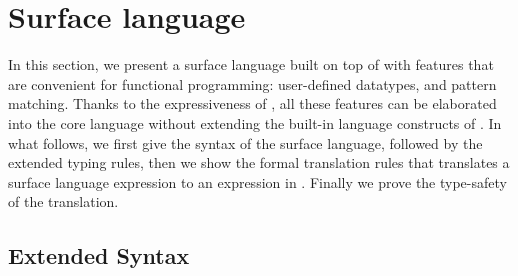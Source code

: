 \newcommand{\FV}{\mathsf{FV}}
\newcommand{\dom}{\mathsf{dom}}

\section{Surface language}
\label{sec:surface}


In this section, we present a surface language built on top of \name with
features that are convenient for functional programming: user-defined
datatypes, and pattern matching. Thanks to the expressiveness of
\name, all these features can be elaborated into the core language
without extending the built-in language constructs of \name. In what
follows, we first give the syntax of the surface language, followed by
the extended typing rules, then we show the formal translation rules
that translates a surface language expression to an expression in
\name. Finally we prove the type-safety of the translation.

\subsection{Extended Syntax}


